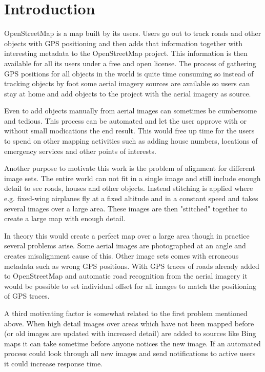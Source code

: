 \newpage
\section{Introduction}
OpenStreetMap is a map built by its users. Users go out to track roads and
other objects with GPS positioning and then adds that information together with
interesting metadata to the OpenStreetMap project. This information is then
available for all its users under a free and open license. The process of
gathering GPS positions for all objects in the world is quite time consuming
so instead of tracking objects by foot some aerial imagery sources are
available so users can stay at home and add objects to the project with the
aerial imagery as source.

Even to add objects manually from aerial images can sometimes be cumbersome and
tedious. This process can be automated and let the user approve with or
without small modications the end result. This would free up time for the
users to spend on other mapping activities such as adding house numbers,
locations of emergency services and other points of interests.

Another purpose to motivate this work is the problem of alignment for
different image sets. The entire world can not fit in a single image
and still include enough detail to see roads, houses and other objects.
Instead stitching is applied where e.g. fixed-wing airplanes fly at a fixed
altitude and in a constant speed and takes several images over a large area.
These images are then "stitched" together to create a large map with enough detail.

In theory this would create a perfect map over a large area though in practice
several problems arise. Some aerial images are photographed at an angle and
creates misalignment cause of this. Other image sets comes with erroneous metadata
such as wrong GPS positions. With GPS traces of roads already added to OpenStreetMap
and automatic road recognition from the aerial imagery it would be possible to
set individual offset for all images to match the positioning of GPS traces.

A third motivating factor is somewhat related to the first problem mentioned above.
When high detail images over areas which have not been mapped before (or old
images are updated with increased detail) are added to sources like Bing maps
it can take sometime before anyone notices the new image. If an automated
process could look through all new images and send notifications to active
users it could increase response time.


